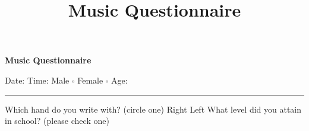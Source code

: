 \documentclass[12pt, a4paper]{article}
\title{Music Questionnaire}
\date{}
\author{}
\begin{document}
\begin{center}
\noindent\textbf{\Huge{Music Questionnaire}}
\end{center}
\begin{center}
\end{center}

\vspace{8pt}

\noindent Date: \hrulefill \hspace {2pt} Time:\hrulefill
\vspace{4pt}
\newline \noindent Male $\square$ \hspace{6pt}Female $\square$ \hspace{15pt} Age: \rule{3cm}{0.5pt}

\vspace{20pt}
\noindent Which hand do you write with? (circle one)\hspace{6pt} Right \hspace{6pt} Left
\vspace{6pt}
\newline What level did you attain in school? (please check one)
\vspace{8pt}
\end{document}
